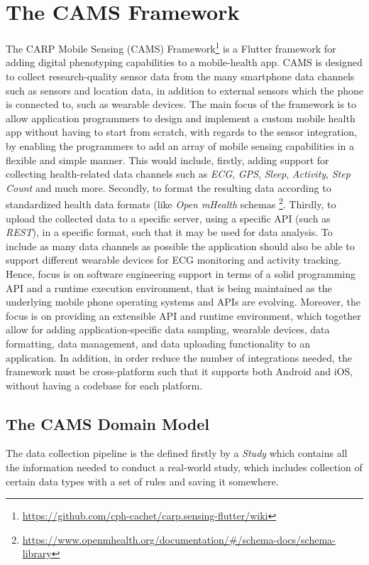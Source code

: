 \section{The CAMS Framework}
The CARP Mobile Sensing (CAMS) Framework\footnote{\url{https://github.com/cph-cachet/carp.sensing-flutter/wiki}} is a Flutter framework for adding digital phenotyping capabilities to a mobile-health app. CAMS is designed to collect research-quality sensor data from the many smartphone data channels such as sensors and location data, in addition to external sensors which the phone is connected to, such as wearable devices. The main focus of the framework is to allow application programmers to design and implement a custom mobile health app without having to start from scratch, with regards to the sensor integration, by enabling the programmers to add an array of mobile sensing capabilities in a flexible and simple manner. This would include, firstly, adding support for collecting health-related data channels such as \textit{ECG}, \textit{GPS}, \textit{Sleep}, \textit{Activity}, \textit{Step Count} and much more. Secondly, to format the resulting data according to standardized health data formats (like \textit{Open mHealth} schemas \footnote{\url{https://www.openmhealth.org/documentation/#/schema-docs/schema-library}}. Thirdly, to upload the collected data to a specific server, using a specific API (such as \textit{REST}), in a specific format, such that it may be used for data analysis. To include as many data channels as possible the application should also be able to support different wearable devices for ECG monitoring and activity tracking. Hence, focus is on software engineering support in terms of a solid programming API and a runtime execution environment, that is being maintained as the underlying mobile phone operating systems and APIs are evolving. Moreover, the focus is on providing an extensible API and runtime environment, which together allow for adding application-specific data sampling, wearable devices, data formatting, data management, and data uploading functionality to an application. In addition, in order reduce the number of integrations needed, the framework must be cross-platform such that it supports both Android and iOS, without having a codebase for each platform.

\subsection{The CAMS Domain Model}
The data collection pipeline is the defined firstly by a \textit{Study} which contains all the information needed to conduct a real-world study, which includes collection of certain data types with a set of rules and saving it somewhere. 


